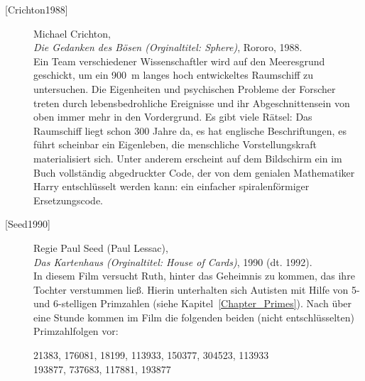 \begin{description}
\item[\textrm{[Crichton1988]}] 
    Michael Crichton, \\
    {\em Die Gedanken des Bösen (Orginaltitel: Sphere)}, Rororo, 1988. \\
    Ein Team verschiedener Wissenschaftler wird auf den Meeresgrund geschickt,
    um ein 900~m langes hoch entwickeltes Raumschiff zu untersuchen. Die
    Eigenheiten und psychischen Probleme der Forscher treten durch lebensbedrohliche
    Ereignisse und ihr Abgeschnittensein von oben immer mehr in den Vordergrund.
    Es gibt viele Rätsel: Das Raumschiff liegt schon 300 Jahre da, es hat
    englische Beschriftungen, es führt scheinbar ein Eigenleben, die menschliche
    Vorstellungskraft materialisiert sich. Unter anderem erscheint auf dem
    Bildschirm ein im Buch vollständig abgedruckter Code, der von dem genialen
    Mathematiker Harry entschlüsselt werden kann: ein einfacher spiralenförmiger
    Ersetzungscode.\\


\item[\textrm{[Seed1990]}] 
    Regie Paul Seed (Paul Lessac), \\
    {\em Das Kartenhaus (Orginaltitel: House of Cards)}, 1990 (dt. 1992). \\
    In diesem Film versucht Ruth, hinter das Geheimnis zu kommen, das ihre
    Tochter verstummen ließ. Hierin unterhalten sich Autisten mit Hilfe von
    5- und 6-stelligen Primzahlen (siehe
    Kapitel~\ref{Chapter_Primes}).
    Nach über eine Stunde kommen im Film die folgenden beiden (nicht
    entschlüsselten) Primzahlfolgen vor:
    \begin{center}
    \num{21383}, \num{176081}, \num{18199}, \num{113933}, \num{150377},
	\num{304523}, \num{113933}\\
    \num{193877}, \num{737683}, \num{117881}, \num{193877}
    \end{center}



\end{description}
